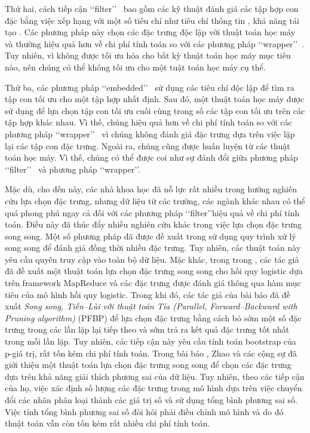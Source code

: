 Thứ hai, cách tiếp cận \lq\lq filter\rq\rq~ bao gồm các kỹ thuật đánh giá các tập hợp con đặc bằng việc xếp hạng với một số tiêu chí như tiêu chí thông tin \cite{nguyen2014effective, shishkin2016efficient}, khả năng tái tạo \cite{farahat2011efficient, masaeli2010convex}. Các phương pháp này chọn các đặc trưng độc lập với thuật toán học máy và thường hiệu quả hơn về chi phí tính toán so với các phương pháp \lq\lq wrapper\rq\rq~\cite{li2017feature}. Tuy nhiên, vì không được tối ưu hóa cho bất kỳ thuật toán học máy mục tiêu nào, nên chúng có thể không tối ưu cho một tuật toán học máy cụ thể.

Thứ ba, các phương pháp \lq\lq embedded\rq\rq~ sử dụng các tiêu chí độc lập để tìm ra tập con tối ưu cho một tập hợp nhất định. Sau đó, một thuật toán học máy được sử dụng để lựa chọn tập con tối ưu cuối cùng trong số các tập con tối ưu trên các tập hợp khác nhau. Vì thế, chúng hiệu quả hơn về chi phí tính toán so với các phương pháp \lq\lq wrapper\rq\rq~ vì chúng không đánh giá đặc trưng dựa trên việc lặp lại các tập con đặc trưng. Ngoài ra, chúng cũng được huấn luyện từ các thuật toán học máy. Vì thế, chúng có thể được coi như sự đánh đổi giữa phương pháp \lq\lq filter\rq\rq~ và phương pháp \lq\lq wrapper\rq\rq \cite{li2017feature}.

Mặc dù, cho đến này, các nhà khoa học đã nỗ lực rất nhiều trong hướng nghiên cứu lựa chọn đặc trưng, nhưng dữ liệu từ các trường, các ngành khác nhau có thể quá phong phú ngay cả đối với các phương pháp \lq\lq filter\rq\rq hiệu quả về chi phí tính toán. Điều này đã thúc đẩy nhiều nghiên cứu khác trong việc lựa chọn đặc trưng song song. Một số phương pháp đã được đề xuất trong \cite{melab2006grid,de2006parallelizing,garcia2006parallel,guillen2009efficient,lopez2006solving} sử dụng quy trình xử lý song song để đánh giá đồng thời nhiều đặc trưng. Tuy nhiên, các thuật toán này yêu cầu quyên truy cập vào toàn bộ dữ liệu. Mặc khác, trong trong \cite{singh2009parallel}, các tác giả đã đề xuất một thuật toán lựa chọn đặc trưng song song cho hồi quy logistic dựa trên framework MapReduce và các đặc trưng được đánh giá thông qua hàm mục tiêu của mô hình hồi quy logistic. Trong khi đó, các tác giả của bài báo \cite{tsamardinos2019greedy} đã đề xuất \textit{Song song, Tiến–Lùi với thuật toán Tỉa (Parallel, Forward–Backward with Pruning algorithm)} (PFBP) để lựa chọn đặc trưng bằng cách bỏ sớm một số đặc trưng trong các lần lặp lại tiếp theo và sớm trả ra kết quả đặc trưng tốt nhất trong mỗi lần lặp. Tuy nhiên, các tiếp cận này yêu cầu tính toán bootstrap của p-giá trị, rất tốn kém chi phí tính toán. Trong bài báo \cite{zhao2013massively}, Zhao và các cộng sự đã giới thiệu một thuật toán lựa chọn đặc trưng song song để chọn các đặc trưng dựa trên khả năng giải thích phương sai của dữ liệu. Tuy nhiên, theo các tiếp cận của họ, việc xác định số lượng các đặc trưng trong mô hình dựa trên việc chuyển đổi các nhãn phân loại thành các giá trị số và sử dụng tổng bình phương sai số. Việc tính tổng bình phương sai số đòi hỏi phải điều chỉnh mô hình và do đó thuật toán vẫn còn tốn kém rất nhiều chi phí tính toán.